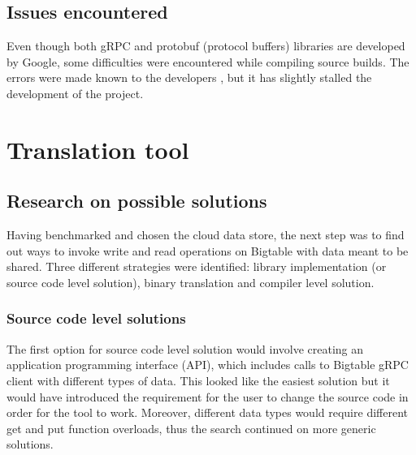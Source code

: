 \documentclass[bsc,frontabs,twoside,singlespacing,parskip,deptreport]{infthesis}     %
\begin{document}
\section{Issues encountered}

Even though both gRPC and protobuf (protocol buffers) libraries are developed by Google, some difficulties were encountered while compiling source builds. The errors were made known to the developers \citep{grpc_issue}, but it has slightly stalled the development of the project.

\chapter{Translation tool}

\section{Research on possible solutions}


Having benchmarked and chosen the cloud data store, the next step was to find out ways to invoke write and read operations on Bigtable with data meant to be shared. Three different strategies were identified: library implementation (or source code level solution), binary translation and compiler level solution.

\subsection{Source code level solutions}

The first option for source code level solution would involve creating an application programming interface (API), which includes calls to Bigtable gRPC client with different types of data. This looked like the easiest solution but it would have introduced the requirement for the user to change the source code in order for the tool to work. Moreover, different data types would require different get and put function overloads, thus the search continued on more generic solutions.
\end{document}
